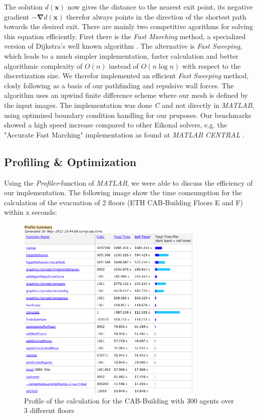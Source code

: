 \documentclass[11pt]{article}
\begin{document}
The solution $d(\mathbf{x})$ now gives the distance to the nearest exit point, its
negative gradient $-\mathbf{\nabla}d(\mathbf{x})$ therefor always points in the 
direction of the shortest path towards the desired exit. There are mainly two
competitive agorithms for solving this equation efficiently. First there is the
\textit{Fast Marching} method, a specialized version of Dijkstra's well known 
algorithm \cite{dijkstra59a}. The alternative is \textit{Fast Sweeping}, which 
leads to a much simpler implementation, faster calculation and better algorithmic
complexity of $O(n)$ instead of $O(n\log n)$ with respect to the discretization size.
We therefor implemented an efficient \textit{Fast Sweeping} method, closly following
\cite{Zhao04afast} as a basis of our pathfinding and repulsive wall forces. The 
algorithm uses an upwind finite difference scheme where our mesh is defined by 
the input images. The implementation was done \textit{C} and not directly in
\textit{MATLAB}, using optimized boundary condition handling for our pruposes.
Our benchmarks showed a high speed increase compared to other Eikonal solvers,
e.g. the "Accurate Fast Marching" implementation as found at \textit{MATLAB CENTRAL}
\cite{fastmarching}.




\subsection{Profiling \& Optimization}



Using the \textit{Profiler}-function of \textit{MATLAB}, we were able to discuss
the efficiency of our implementation. The following image show the time comsumption
for the calculation of the evacuation of 2 floors (ETH CAB-Building Floors E and F) within x seconds:

\begin{figure}[h]
\centering
\includegraphics[width=0.8\textwidth]{./images/profiler.png}
\caption{Profile of the calculation for the CAB-Building with 300 agents over 3 different floors} 
\label{cab profile}
\end{figure}
\end{document}
